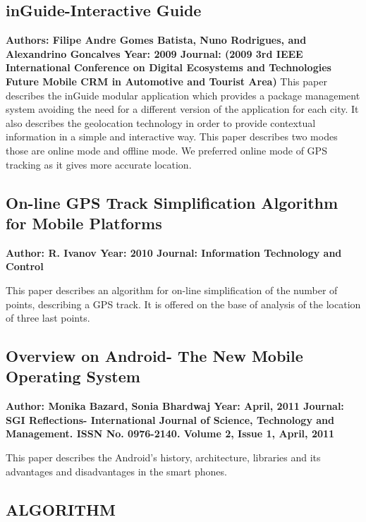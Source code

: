 \documentclass[12pt,a4paper]{article}
\begin{document}
\subsection{inGuide-Interactive Guide}
\textbf{Authors: 	Filipe Andre Gomes Batista, Nuno Rodrigues, and Alexandrino Goncalves
Year: 		2009
Journal:	(2009 3rd IEEE International Conference on Digital Ecosystems and Technologies Future Mobile CRM in Automotive and Tourist Area)
}
This paper describes the inGuide modular application which provides a package management system avoiding the need for a different version of the application for each city. It also describes the geolocation technology in order to provide contextual information in a simple and interactive way. This paper describes two modes those are online mode and offline mode. We preferred online mode of GPS tracking as it gives more accurate location.  
\\

\subsection{On-line GPS Track Simplification Algorithm for Mobile Platforms}
\textbf{Author:	R. Ivanov
	Year:		2010
	Journal:	Information Technology and Control
}

This paper describes an algorithm for on-line simplification of the number of points, describing a GPS track. It is offered on the base of analysis of the location of three last points.
\\

\subsection{Overview on Android- The New Mobile Operating System}
\textbf{Author:	Monika Bazard, Sonia Bhardwaj
	Year:		April, 2011
Journal:	SGI Reflections- International Journal of Science, Technology and             Management. ISSN No. 0976-2140. Volume 2, Issue 1, April, 2011
}

This paper describes the Android’s history, architecture, libraries and its advantages and disadvantages in the smart phones.
\\

\newpage
\begin{center}
\section{ALGORITHM}
\end{center}
\pagestyle{plain}
\end{document}
